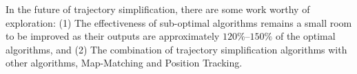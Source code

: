 In the future of trajectory simplification, there are some work worthy of exploration:
%
(1) The effectiveness of sub-optimal algorithms remains a small room to be improved as their outputs are approximately $120\%$--$150\%$ of the optimal algorithms, and
%
(2) The combination of trajectory simplification algorithms with other algorithms, \eg Map-Matching and Position Tracking.

